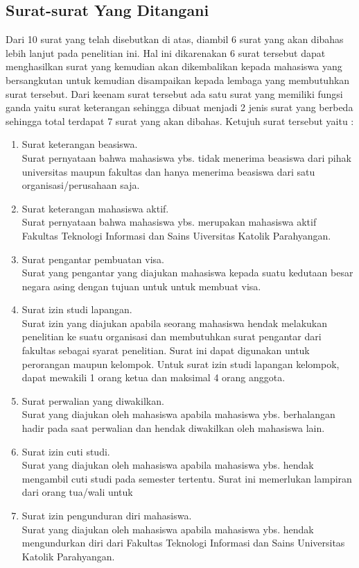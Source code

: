 \subsection{Surat-surat Yang Ditangani}
\label{sec:surat_yang_ditangani}
Dari 10 surat yang telah disebutkan di atas, diambil 6 surat yang akan dibahas lebih lanjut pada penelitian ini. Hal ini dikarenakan 6 surat tersebut dapat menghasilkan surat yang kemudian akan dikembalikan kepada mahasiswa yang bersangkutan untuk kemudian disampaikan kepada lembaga yang membutuhkan surat tersebut. Dari keenam surat tersebut ada satu surat yang memiliki fungsi ganda yaitu surat keterangan sehingga dibuat menjadi 2 jenis surat yang berbeda sehingga total terdapat 7 surat yang akan dibahas. Ketujuh surat tersebut yaitu :
\begin{enumerate}
	\item Surat keterangan beasiswa. \\
	Surat pernyataan bahwa mahasiswa ybs. tidak menerima beasiswa dari pihak universitas maupun fakultas dan hanya menerima beasiswa dari satu organisasi/perusahaan saja.
	\item Surat keterangan mahasiswa aktif. \\
	Surat pernyataan bahwa mahasiswa ybs. merupakan mahasiswa aktif Fakultas Teknologi Informasi dan Sains Uiversitas Katolik Parahyangan.
	\item Surat pengantar pembuatan visa. \\
	Surat yang pengantar yang diajukan mahasiswa kepada suatu kedutaan besar negara asing dengan tujuan untuk untuk membuat visa.
	\item Surat izin studi lapangan. \\
	Surat izin yang diajukan apabila seorang mahasiswa hendak melakukan penelitian ke suatu organisasi dan membutuhkan surat pengantar dari fakultas sebagai syarat penelitian. Surat ini dapat digunakan untuk perorangan maupun kelompok. Untuk surat izin studi lapangan kelompok, dapat mewakili 1 orang ketua dan maksimal 4 orang anggota.
	\item Surat perwalian yang diwakilkan. \\
	Surat yang diajukan oleh mahasiswa apabila mahasiswa ybs. berhalangan hadir pada saat perwalian dan hendak diwakilkan oleh mahasiswa lain. 
	\item Surat izin cuti studi. \\
	Surat yang diajukan oleh mahasiswa apabila mahasiswa ybs. hendak mengambil cuti studi pada semester tertentu. Surat ini memerlukan lampiran dari orang tua/wali untuk
	\item Surat izin pengunduran diri mahasiswa. \\
	Surat yang diajukan oleh mahasiswa apabila mahasiswa ybs. hendak mengundurkan diri dari Fakultas Teknologi Informasi dan Sains Universitas Katolik Parahyangan.
\end{enumerate}

